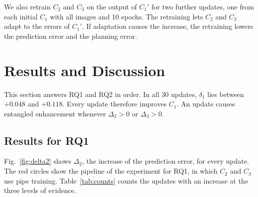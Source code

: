 \documentclass[conference]{IEEEtran}
\begin{document}
We also retrain $C_2$ and $C_3$ on the output of $C_1'$ for two further updates, one from each initial $C_1$ with all images and 10 epochs. The retraining lets $C_2$ and $C_3$ adapt to the errors of $C_1'$. If adaptation causes the increase, the retraining lowers the prediction error and the planning error.

\section{Results and Discussion}

This section answers RQ1 and RQ2 in order. In all 30 updates, $\delta_1$ lies between $+0.048$ and $+0.118$. Every update therefore improves $C_1$. An update causes entangled enhancement whenever $\Delta_2 > 0$ or $\Delta_3 > 0$.

\subsection{Results for RQ1}
\label{sec:pred}
Fig.~\ref{fig:delta2} shows $\Delta_2$, the increase of the prediction error, for every update. The red circles show the pipeline of the experiment for RQ1, in which $C_2$ and $C_3$ use pipe training. Table~\ref{tab:counts} counts the updates with an increase at the three levels of evidence.
\end{document}

